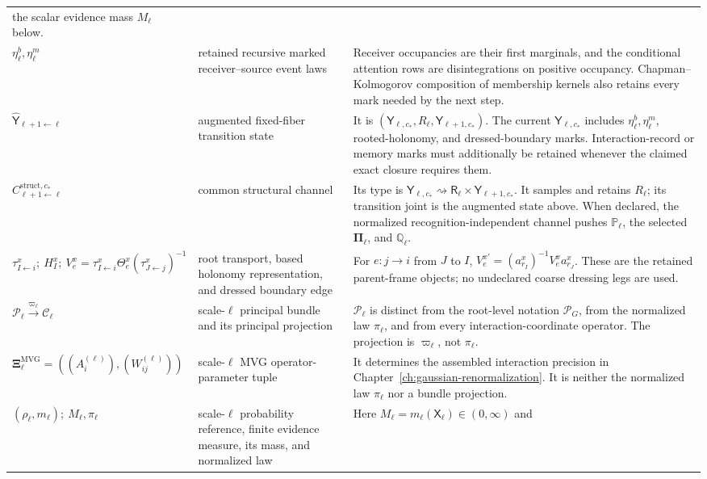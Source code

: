 \begin{longtable}{@{}>{\raggedright\arraybackslash}p{}
>{\raggedright\arraybackslash}p{}
>{\raggedright\arraybackslash}p{}@{}}
the scalar evidence mass \(M_\ell\) below. \\
\(\eta_\ell^{b},\eta_\ell^{m}\) &
retained recursive marked receiver--source event laws &
Receiver occupancies are their first marginals, and the conditional attention
rows are disintegrations on positive occupancy. Chapman--Kolmogorov composition
of membership kernels also retains every mark needed by the next step. \\
\(\widehat{\mathsf Y}_{\ell+1\leftarrow\ell}\) &
augmented fixed-fiber transition state &
It is
\((\mathsf Y_{\ell,c_*},R_\ell,\mathsf Y_{\ell+1,c_*})\). The current
\(\mathsf Y_{\ell,c_*}\) includes \(\eta_\ell^b,\eta_\ell^m\), rooted-holonomy,
and dressed-boundary marks. Interaction-record or memory marks must additionally
be retained whenever the claimed exact closure requires them. \\
\(C^{\mathrm{struct},c_*}_{\ell+1\leftarrow\ell}\) &
common structural channel &
Its type is \(\mathsf Y_{\ell,c_*}\rightsquigarrow
\mathsf R_\ell\times\mathsf Y_{\ell+1,c_*}\). It samples and retains
\(R_\ell\); its transition joint is the augmented state above. When declared,
the normalized recognition-independent channel pushes \(\mathbb P_\ell\), the
selected \(\boldsymbol\Pi_\ell\), and \(\mathbb Q_\ell\). \\
\(\tau^x_{I\leftarrow i};\ H_I^x;\
V_e^x=\tau^x_{I\leftarrow i}\Theta_e^x
(\tau^x_{J\leftarrow j})^{-1}\) &
root transport, based holonomy representation, and dressed boundary edge &
For \(e:j\to i\) from \(J\) to \(I\),
\(V_e^{x\prime}=(a^x_{r_I})^{-1}V_e^xa^x_{r_J}\). These are the retained
parent-frame objects; no undeclared coarse dressing legs are used. \\
\(\mathscr P_\ell\xrightarrow{\varpi_\ell}\mathcal C_\ell\) &
scale-\(\ell\) principal bundle and its principal projection &
\(\mathscr P_\ell\) is distinct from the root-level notation \(\mathscr P_G\), from the
normalized law \(\pi_\ell\), and from every interaction-coordinate operator.
The projection is \(\varpi_\ell\), not \(\pi_\ell\). \\
\(\boldsymbol\Xi_\ell^{\mathrm{MVG}}
=((A_i^{(\ell)}),(W_{ij}^{(\ell)}))\) &
scale-\(\ell\) MVG operator-parameter tuple &
It determines the assembled interaction precision in
Chapter~\ref{ch:gaussian-renormalization}.
It is neither the normalized law \(\pi_\ell\) nor a bundle projection. \\
\((\rho_\ell,m_\ell);\ M_\ell,\pi_\ell\) &
scale-\(\ell\) probability reference, finite evidence measure, its mass, and
normalized law &
Here \(M_\ell=m_\ell(\mathsf X_\ell)\in(0,\infty)\) and

\end{longtable}
